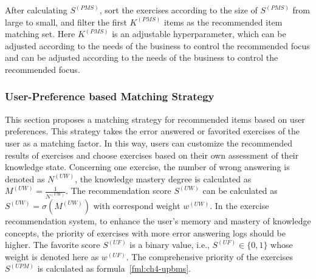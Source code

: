 After calculating \(S^{(PMS)}\), sort the exercises according to the size of \(S^{(PMS)}\) from large to small, and filter the first \(K^{(PMS)}\) items as the recommended item matching set. Here \(K^{(PMS)}\) is an adjustable hyperparameter, which can be adjusted according to the needs of the business to control the recommended focus and can be adjusted according to the needs of the business to control the recommended focus.

\subsubsection{User-Preference based Matching Strategy}


This section proposes a matching strategy for recommended items based on user preferences. This strategy takes the error answered or favorited exercises of the user as a matching factor. In this way, users can customize the recommended results of exercises and choose exercises based on their own assessment of their knowledge state. Concerning one exercise, the number of wrong answering is denoted as \(N^{(UW)}\), the knowledge mastery degree is calculated as \(M^{(UW)}=\frac{1}{N^{(UW)}}\). The recommendation score \(S^{(UW)}\) can be calculated as \(S^{(UW)}=\sigma(M^{(UW)}) \)  with correspond weight \(w^{(UW)}\). In the exercise recommendation system, to enhance the user's memory and mastery of knowledge concepts, the priority of exercises with more error answering logs should be higher. The favorite score \(S^{(UF)}\) is a binary value, i.e., \(S^{(UF)}\in \{0,1\} \) whose weight is denoted here as \(w^{(UF)}\). The comprehensive priority of the exercises \(S^{(UPM)}\) is calculated as formula~\ref{fml:ch4-upbms}.

